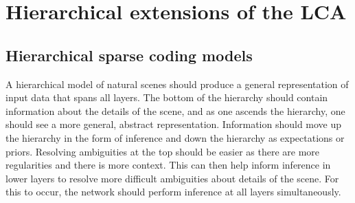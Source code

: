 \chapter{Hierarchical extensions of the LCA}

\section{Hierarchical sparse coding models}\label{sec:ch3_related_models}
A hierarchical model of natural scenes should produce a general representation of input data that spans all layers. The bottom of the hierarchy should contain information about the details of the scene, and as one ascends the hierarchy, one should see a more general, abstract representation. Information should move up the hierarchy in the form of inference and down the hierarchy as expectations or priors. Resolving ambiguities at the top should be easier as there are more regularities and there is more context. This can then help inform inference in lower layers to resolve more difficult ambiguities about details of the scene. For this to occur, the network should perform inference at all layers simultaneously.

